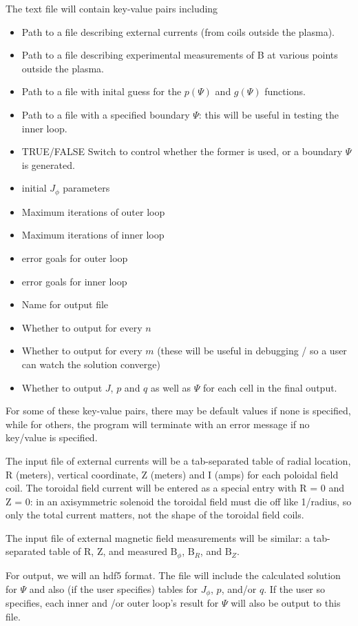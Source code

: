 \documentclass[paper=a4, fontsize=11pt]{scrartcl} %
\numberwithin{equation}{section} %
\numberwithin{figure}{section} %
\numberwithin{table}{section} %
\begin{document}
The text file will contain key-value pairs including
\begin{itemize}
\item Path to a file describing external currents (from coils outside the plasma).
\item Path to a file describing experimental measurements of B at various points outside the plasma.
\item Path to a file with inital guess for the $p(\Psi)$ and $g(\Psi)$ functions.
\item Path to a file with a specified boundary $\Psi$: this will be useful in testing the inner loop.
\item TRUE/FALSE Switch to control whether the former is used, or a boundary $\Psi$ is generated.
\item initial $J_\phi$ parameters
\item Maximum iterations of outer loop
\item Maximum iterations of inner loop
\item error goals for outer loop
\item error goals for inner loop
\item Name for output file
\item Whether to output for every $n$
\item Whether to output for every $m$ (these will be useful in debugging / so a user can watch the solution converge)
\item Whether to output $J$, $p$ and $q$ as well as $\Psi$ for each cell in the final output.
\end{itemize}

For some of these key-value pairs, there may be default values if none is specified, while for others, the program will terminate with an error message if no key/value is specified.

The input file of external currents will be a tab-separated table of radial location, R (meters), vertical coordinate, Z (meters) and I (amps) for each poloidal field coil. The toroidal field current will be entered as a special entry with R = 0 and Z = 0: in an axisymmetric solenoid the toroidal field must die off like 1/radius, so only the total current matters, not the shape of the toroidal field coils.

The input file of external magnetic field measurements will be similar: a tab-separated table of R, Z, and measured $\text{B}_\phi$, $\text{B}_R$, and $\text{B}_Z$.

For output, we will an hdf5 format. The file will include the calculated solution for $\Psi$ and also (if the user specifies) tables for $J_\phi$, $p$, and/or $q$. If the user so specifies, each inner and /or outer loop's result for $\Psi$ will also be output to this file.
\end{document}
